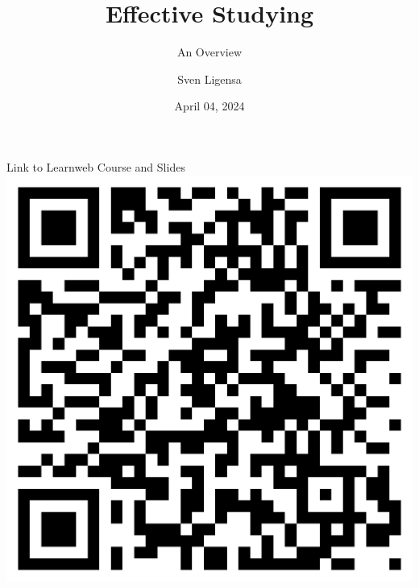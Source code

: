\documentclass{ercisbeamer}
\title{Effective Studying}
\subtitle{An Overview}
\author{Sven Ligensa}
\institute{European Research Center for Information Systems (ERCIS)}
\date{April 04, 2024}
\begin{document}
\begin{frame}{Link to Learnweb Course and Slides}
    \centering \includegraphics[height=.9\paperheight]{00_resources/qr_lw_course.png}
\end{frame}

\begin{frame}
    \begin{tbox}
        \titlepage
    \end{tbox}
\end{frame}
\setbgimage{}
\end{document}
